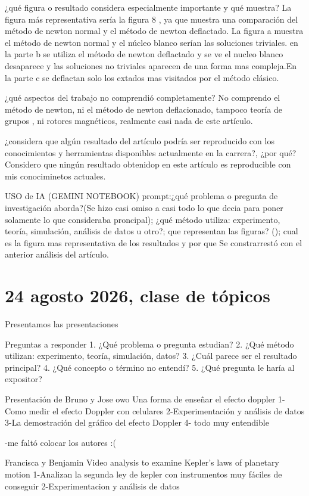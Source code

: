 \documentclass{article}
\begin{document}
¿qué figura o resultado considera especialmente importante y qué muestra?
La figura más representativa sería la figura 8 , ya que muestra una comparación del método de newton normal y el método de newton deflactado. La figura a muestra el método de newton normal y el núcleo blanco serían las soluciones triviales. en la parte b se utiliza el método de newton deflactado y se ve el nucleo blanco desaparece y las soluciones no triviales aparecen de una forma mas compleja.En la parte c se deflactan solo los extados mas visitados por el método clásico.

¿qué aspectos del trabajo no comprendió completamente?
No comprendo el método de newton, ni el método de newton deflacionado, tampoco teoría de grupos , ni rotores magnéticos, realmente casi nada de este artículo.

¿considera que algún resultado del artículo podría ser reproducido con los conocimientos y
herramientas disponibles actualmente en la carrera?, ¿por qué?
Considero que ningún resultado obtenidop en este artículo es reproducible con mis conociminetos actuales.

USO de IA (GEMINI NOTEBOOK)
prompt:¿qué problema o pregunta de investigación aborda?(Se hizo casi omiso a casi todo lo que decia para poner solamente lo que consideraba proncipal); ¿qué método utiliza: experimento, teoría, simulación, análisis de datos u otro?;
que representan las figuras? ();
cual es la figura mas representativa de los resultados y por que
Se constrarrestó con el  anterior análisis del artículo.



\section{24 agosto 2026, clase de tópicos}

Presentamos las presentaciones

Preguntas a responder
1. ¿Qué problema o pregunta estudian?
2. ¿Qué método utilizan: experimento, teoría, simulación, datos?
3. ¿Cuál parece ser el resultado principal?
4. ¿Qué concepto o término no entendí?
5. ¿Qué pregunta le haría al expositor?

Presentación de Bruno y Jose owo
Una forma de enseñar el efecto doppler
1-Como medir el efecto Doppler con celulares
2-Experimentación y análisis de datos
3-La demostración del gráfico del efecto Doppler
4- todo muy entendible

-me faltó colocar los autores :(

Francisca y Benjamin
Video analysis to examine Kepler's laws of planetary motion
1-Analizan la segunda ley de kepler con instrumentos muy fáciles de conseguir
2-Experimentacion y análisis de datos
\end{document}
